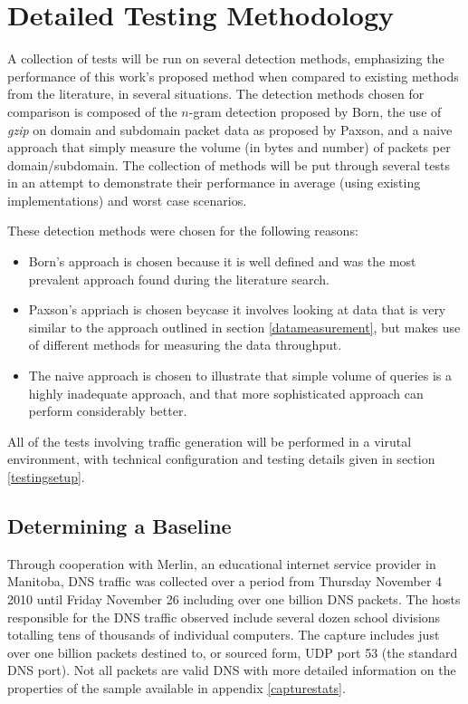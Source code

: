 \documentclass[12pt]{report}
\theoremstyle{remark}
\theoremstyle{definition}
\theoremstyle{definition}
\theoremstyle{definition}
\begin{document}
\section{Detailed Testing Methodology} A collection of tests will be run on
several detection methods, emphasizing the performance of this work's proposed
method when compared to existing methods from the literature, in several
situations. The detection methods chosen for comparison is composed of the
$n$-gram detection proposed by Born\cite{Born2010.cfa}, the use of \emph{gzip}
on domain and subdomain packet data as proposed by Paxson\cite{Paxson2011}, and
a naive approach that simply measure the volume (in bytes and number) of packets
per domain/subdomain. The collection of methods will be put through several
tests in an attempt to demonstrate their performance in average (using existing
implementations) and worst case scenarios.

These detection methods were chosen for the following reasons:

\begin{itemize} \item Born's approach is chosen because it is well defined and
was the most prevalent approach found during the literature search. \item
Paxson's appriach is chosen beycase it involves looking at data that is very
similar to the approach outlined in section \ref{datameasurement}, but makes use
of different methods for measuring the data throughput. \item The naive approach
is chosen to illustrate that simple volume of queries is a highly inadequate
approach, and that more sophisticated approach can perform considerably better.
\end{itemize}

All of the tests involving traffic generation will be performed in a virutal
environment, with technical configuration and testing details given in section
\ref{testingsetup}.

\subsection{Determining a Baseline} \label{baselinetest} Through cooperation
with Merlin, an educational internet service provider in Manitoba, DNS traffic
was collected over a period from Thursday November 4 2010 until Friday November
26 including over one billion DNS packets. The hosts responsible for the DNS
traffic observed include several dozen school divisions totalling tens of
thousands of individual computers. The capture includes just over one billion
packets destined to, or sourced form, UDP port 53 (the standard DNS port). Not
all packets are valid DNS with more detailed information on the properties of
the sample available in appendix \ref{capturestats}.
\end{document}
